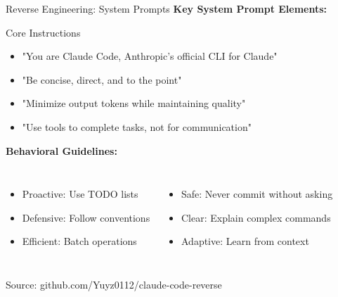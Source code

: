 \documentclass[aspectratio=169]{beamer}
\begin{document}
\begin{frame}{Reverse Engineering: System Prompts}
	\textbf{Key System Prompt Elements:}
	
	\begin{block}{Core Instructions}
		\footnotesize
		\begin{itemize}
			\item "You are Claude Code, Anthropic's official CLI for Claude"
			\item "Be concise, direct, and to the point"
			\item "Minimize output tokens while maintaining quality"
			\item "Use tools to complete tasks, not for communication"
		\end{itemize}
	\end{block}
	
	\textbf{Behavioral Guidelines:}
	\begin{columns}
		\begin{itemize}
			\item {\color{highlight}Proactive}: Use TODO lists
			\item {\color{highlight}Defensive}: Follow conventions
			\item {\color{highlight}Efficient}: Batch operations
		\end{itemize}
		
		\begin{itemize}
			\item {\color{highlight}Safe}: Never commit without asking
			\item {\color{highlight}Clear}: Explain complex commands
			\item {\color{highlight}Adaptive}: Learn from context
		\end{itemize}
	\end{columns}
	
	\small
	Source: github.com/Yuyz0112/claude-code-reverse
\end{frame}
\end{document}
